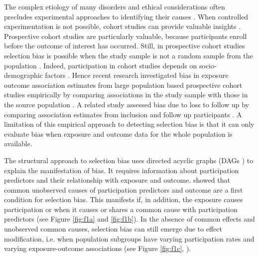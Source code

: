 \documentclass[12pt]{article}
\begin{document}
The complex etiology of many disorders and ethical considerations often precludes experimental approaches to identifying their causes \cite{Rothman2008-sq}. When controlled experimentation is not possible, cohort studies can provide valuable insights \cite{Greenland2017-qr}. Prospective cohort studies are particularly valuable, because participants enroll before the outcome of interest has occurred. Still, in prospective cohort studies selection bias is possible when the study sample is not a random sample from the population \cite{Hernan2004-oz}. Indeed, participation in cohort studies depends on socio-demographic factors \cite{Galea2007-hv}. Hence recent research investigated bias in exposure outcome association estimates from large population based prospective cohort studies empirically by comparing associations in the study sample with those in the source population \cite{Nilsen2009-ci, Nohr2006-uf, Hatch2016-us}.
A related study assessed bias due to loss to follow up by comparing association estimates from inclusion and follow up participants \cite{Greene2011-am}. A limitation of this empirical approach to detecting selection bias is that it can only evaluate bias when exposure and outcome data for the whole population is available.

The structural approach to selection bias uses directed acyclic graphs (DAGs \cite{Pearl1995-ss}) to explain the manifestation of bias. It requires information about participation predictors and their relationship with exposure and outcome. \citeauthor{Hernan2004-oz} \cite{Hernan2004-oz} showed that common unobserved causes of participation predictors and outcome are a first condition for selection bias. This manifests if, in addition, the exposure causes participation or when it causes or shares a common cause with participation predictors (see Figure \ref{fig:f1a} and \ref{fig:f1b}). In the absence of common effects and unobserved common causes, selection bias can still emerge due to effect modification, i.e. when population subgroups have varying participation rates and varying exposure-outcome associations (see Figure \ref{fig:f1c}, \cite{Greenland1989-kd, VanderWeele2009-lm}).
\end{document}
